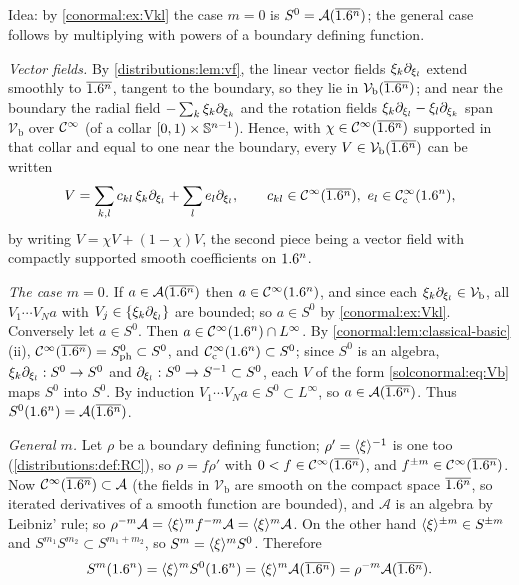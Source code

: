 \subsection*{}
Idea: by \cref{conormal:ex:Vkl} the case $m=0$ is $S^0=\mathcal A(\overline{1.6^n})$; the general case
follows by multiplying with powers of a boundary defining function.

\emph{Vector fields.} By \cref{distributions:lem:vf}, the linear vector fields
$\xi_k\partial_{\xi_l}$ extend smoothly to $\overline{1.6^n}$, tangent to the boundary, so they lie in
$\mathcal V_{\mathrm b}(\overline{1.6^n})$; and near the boundary the radial field $-\sum_k\xi_k
\partial_{\xi_k}$ and the rotation fields $\xi_k\partial_{\xi_l}-\xi_l\partial_{\xi_k}$ span
$\mathcal V_{\mathrm b}$ over $\mathcal{C}^\infty$ (of a collar $[0,1)\times\mathbb{S}^{n-1}$). Hence, with
$\chi\in\mathcal{C}^\infty(\overline{1.6^n})$ supported in that collar and equal to one near the boundary, every
$V\in\mathcal V_{\mathrm b}(\overline{1.6^n})$ can be written
\begin{equation}\label{solconormal:eq:Vb}
V=\sum_{k,l}c_{kl}\,\xi_k\partial_{\xi_l}+\sum_le_l\partial_{\xi_l},\qquad c_{kl}\in\mathcal{C}^\infty(\overline{1.6^n}),\
e_l\in\mathcal{C}^\infty_{\mathrm{c}}(1.6^n),
\end{equation}
by writing $V=\chi V+(1-\chi)V$, the second piece being a vector field with compactly supported
smooth coefficients on $1.6^n$.

\emph{The case $m=0$.} If $a\in\mathcal A(\overline{1.6^n})$ then $a\in\mathcal{C}^\infty(1.6^n)$, and since each
$\xi_k\partial_{\xi_l}\in\mathcal V_{\mathrm b}$, all $V_1\cdots V_Na$ with $V_j\in\{\xi_k
\partial_{\xi_l}\}$ are bounded; so $a\in S^0$ by \cref{conormal:ex:Vkl}. Conversely let
$a\in S^0$. Then $a\in\mathcal{C}^\infty(1.6^n)\cap L^\infty$. By \cref{conormal:lem:classical-basic}(ii),
$\mathcal{C}^\infty(\overline{1.6^n})=S^{0}_{\mathrm{ph}}\subset S^0$, and $\mathcal{C}^\infty_{\mathrm{c}}(1.6^n)\subset S^0$; since $S^0$ is an algebra,
$\xi_k\partial_{\xi_l}:S^0\to S^0$ and $\partial_{\xi_l}:S^0\to S^{-1}\subset S^0$, each $V$ of the form
\eqref{solconormal:eq:Vb} maps $S^0$ into $S^0$. By induction $V_1\cdots V_Na\in S^0\subset
L^\infty$, so $a\in\mathcal A(\overline{1.6^n})$. Thus $S^0(1.6^n)=\mathcal A(\overline{1.6^n})$.

\emph{General $m$.} Let $\rho$ be a boundary defining function; $\rho'=\langle \xi\rangle^{-1}$ is one
too (\cref{distributions:def:RC}), so $\rho=f\rho'$ with $0<f\in\mathcal{C}^\infty(\overline{1.6^n})$, and
$f^{\pm m}\in\mathcal{C}^\infty(\overline{1.6^n})$. Now $\mathcal{C}^\infty(\overline{1.6^n})\subset\mathcal A$ (the fields in
$\mathcal V_{\mathrm b}$ are smooth on the compact space $\overline{1.6^n}$, so iterated derivatives of a
smooth function are bounded), and $\mathcal A$ is an algebra by Leibniz' rule; so
$\rho^{-m}\mathcal A=\langle \xi\rangle^m f^{-m}\mathcal A=\langle \xi\rangle^m\mathcal A$. On the other hand
$\langle \xi\rangle^{\pm m}\in S^{\pm m}$ and $S^{m_1}S^{m_2}\subset S^{m_1+m_2}$, so $S^m=\langle \xi\rangle^mS^0$.
Therefore
\begin{equation*}
S^m(1.6^n)=\langle \xi\rangle^mS^0(1.6^n)=\langle \xi\rangle^m\mathcal A(\overline{1.6^n})=\rho^{-m}\mathcal A(\overline{1.6^n}).
\end{equation*}

